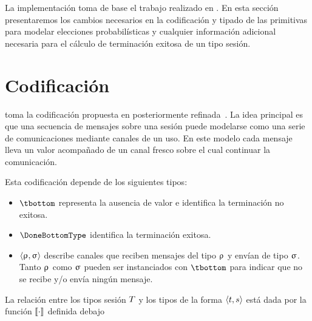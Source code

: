 La implementación toma de base el trabajo realizado en \FuSe. En esta sección
presentaremos los cambios necesarios en la codificación y tipado de las
primitivas para modelar elecciones probabilísticas y cualquier información
adicional necesaria para el cálculo de terminación exitosa de un tipo sesión.

\section{Codificación}

\FuSe toma la codificación propuesta en \cite{Dardha}
posteriormente refinada~\cite{DBLP:journals/jfp/Padovani17}. La
idea principal es que una secuencia de mensajes sobre una sesión puede
modelarse como una serie de comunicaciones mediante canales de un uso. En este
modelo cada mensaje lleva un valor acompañado de un canal fresco sobre el cual
continuar la comunicación.

Esta codificación depende de los siguientes tipos:

\begin{itemize}
	\item $\tbottom$ representa la ausencia de valor e identifica la
		terminación no exitosa.
	\item $\DoneBottomType$ identifica la terminación exitosa.
	\item $\langle\uprho_{},\upsigma_{}\rangle$ describe canales que
		reciben mensajes del tipo $\uprho_{}$ y envían de tipo $\upsigma_{}$.
		Tanto $\uprho_{}$ como $\upsigma_{}$ pueden ser instanciados con
		$\tbottom$ para indicar que no se recibe y/o envía ningún
		mensaje.
\end{itemize}

La relación entre los tipos sesión $T$ y los tipos de la forma
$\langle t,s\rangle$ está dada por la función $\llbracket\cdot\rrbracket$ definida debajo


